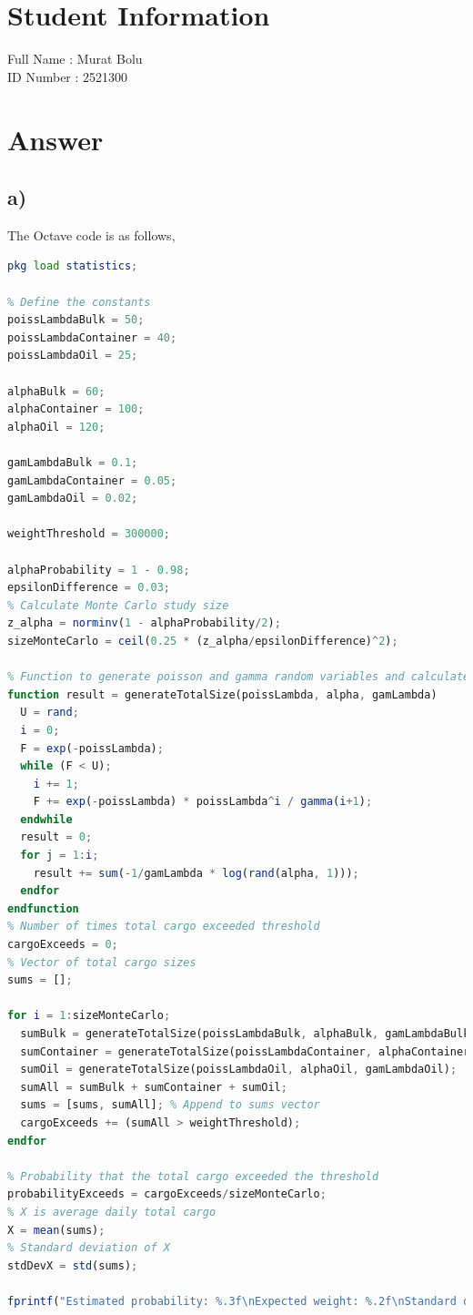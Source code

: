 \documentclass[12pt]{article}
\begin{document}
\section*{Student Information }
Full Name : Murat Bolu \\
ID Number : 2521300 \\

\section*{Answer}

\subsection*{a)}
\noindent
The Octave code is as follows,
\begin{lstlisting}[language=Octave]
% Load statistics module for inverse standard normal distribution
pkg load statistics;

% Define the constants
poissLambdaBulk = 50;
poissLambdaContainer = 40;
poissLambdaOil = 25;

alphaBulk = 60;
alphaContainer = 100;
alphaOil = 120;

gamLambdaBulk = 0.1;
gamLambdaContainer = 0.05;
gamLambdaOil = 0.02;

weightThreshold = 300000;

alphaProbability = 1 - 0.98;
epsilonDifference = 0.03;
% Calculate Monte Carlo study size
z_alpha = norminv(1 - alphaProbability/2);
sizeMonteCarlo = ceil(0.25 * (z_alpha/epsilonDifference)^2);

% Function to generate poisson and gamma random variables and calculate total cargo
function result = generateTotalSize(poissLambda, alpha, gamLambda)
  U = rand;
  i = 0;
  F = exp(-poissLambda);
  while (F < U);
    i += 1;
    F += exp(-poissLambda) * poissLambda^i / gamma(i+1);
  endwhile
  result = 0;
  for j = 1:i;
    result += sum(-1/gamLambda * log(rand(alpha, 1)));
  endfor
endfunction
% Number of times total cargo exceeded threshold
cargoExceeds = 0;
% Vector of total cargo sizes
sums = [];

for i = 1:sizeMonteCarlo;
  sumBulk = generateTotalSize(poissLambdaBulk, alphaBulk, gamLambdaBulk);
  sumContainer = generateTotalSize(poissLambdaContainer, alphaContainer, gamLambdaContainer);
  sumOil = generateTotalSize(poissLambdaOil, alphaOil, gamLambdaOil);
  sumAll = sumBulk + sumContainer + sumOil;
  sums = [sums, sumAll]; % Append to sums vector
  cargoExceeds += (sumAll > weightThreshold);
endfor

% Probability that the total cargo exceeded the threshold
probabilityExceeds = cargoExceeds/sizeMonteCarlo;
% X is average daily total cargo
X = mean(sums);
% Standard deviation of X
stdDevX = std(sums);

fprintf("Estimated probability: %.3f\nExpected weight: %.2f\nStandard deviation: %.2f\n", probabilityExceeds, X, stdDevX);
\end{lstlisting}
\end{document}
